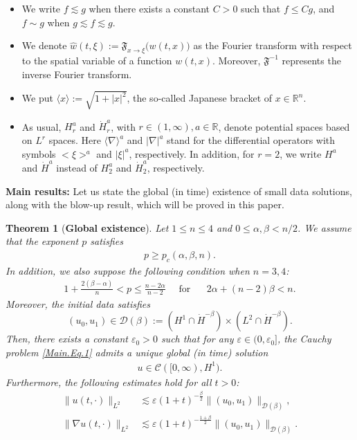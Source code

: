 \documentclass[11pt,reqno]{amsart}
\newtheorem{theorem}{Theorem}[section]
\newcommand{\R}{\mathbb{R}}
\begin{document}
\begin{itemize}[leftmargin=*]
\item We write $f\lesssim g$ when there exists a constant $C>0$ such that $f\le Cg$, and $f \sim g$ when $g\lesssim f\lesssim g$.

\item We denote $\widehat{w}(t,\xi):= \mathfrak{F}_{x\rightarrow \xi}\big(w(t,x)\big)$ as the Fourier transform with respect to the spatial variable of a function $w(t,x)$. Moreover, $\mathfrak{F}^{-1}$ represents the inverse Fourier transform.

\item We put $\langle x\rangle:= \sqrt{1+|x|^2}$, the so-called Japanese bracket of $x \in \R^n$.

\item As usual, $H^{a}_r$ and $\dot{H}^{a}_r$, with $r \in (1, \infty), a \in \mathbb{R}$, denote potential spaces based on $L^r$ spaces. Here $\langle\nabla\rangle^{a}$ and $|\nabla|^{a}$ stand for the differential operators with symbols $\big<\xi\big>^{a}$ and $|\xi|^{a}$, respectively. In addition, for $r=2$, we write $H^a$ and $\dot{H}^a$ instead of $H_2^a$ and $\dot{H}_2^a$, respectively.
\end{itemize}
\medskip

\textbf{Main results:} Let us state the global (in time) existence of small data solutions, along with the blow-up result, which will be proved in this paper.
    \begin{theorem}[\textbf{Global existence}]\label{Theorem1}
        Let $1 \leq n \leq 4$ and $0 \leq \alpha, \beta < n/2$. We assume that the exponent $p$ satisfies  
        \begin{align}
            p \geq p_c(\alpha, \beta, n). \label{critical_exponent}
        \end{align}
In addition, we also suppose the following condition when $n=3,4$:
        \begin{align}
              1 + \displaystyle\frac{2(\beta-\alpha)}{n} < p \leq \displaystyle\frac{n-2\alpha}{n-2} \quad\text{ for }\quad \,\, 2\alpha + (n-2)\beta < n.
           \label{CKN_condition}
         \end{align}
        Moreover, the initial data satisfies
            $$(u_0, u_1) \in \mathcal{D}(\beta) := (H^1 \cap \dot{H}^{-\beta})\times (L^2 \cap \dot{H}^{-\beta}).$$
       Then, there exists a constant $\varepsilon_0 > 0$ such that for any $\varepsilon \in (0, \varepsilon_0]$, the Cauchy problem \eqref{Main.Eq.1} admits a unique global (in time) solution 
        \begin{align*}
            u \in \mathcal{C}([0, \infty), H^1).
        \end{align*}
      Furthermore, the following estimates hold for all $t > 0$:
        \begin{align*}
            \|u(t,\cdot)\|_{L^2} &\lesssim \varepsilon (1+t)^{-\frac{\beta}{2}} \|(u_0,u_1)\|_{\mathcal{D}(\beta)},\\
            \|\nabla u(t,\cdot)\|_{L^2} &\lesssim \varepsilon (1+t)^{-\frac{1+\beta}{2}} \|(u_0,u_1)\|_{\mathcal{D}(\beta)}.
        \end{align*}
    \end{theorem}
\end{document}
